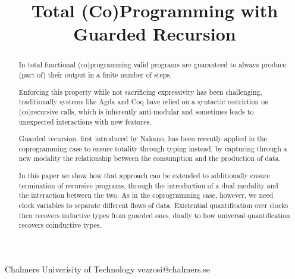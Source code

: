 \documentclass{sigplanconf}
\begin{document}
\setlength{\pdfpageheight}{\paperheight}
\setlength{\pdfpagewidth}{\paperwidth}






\title{Total (Co)Programming with Guarded Recursion}

           {Chalmers Univerisity of Technology}
           {vezzosi@chalmers.se}

\maketitle

\begin{abstract}
In total functional (co)programming valid programs are guaranteed to
always produce (part of) their output in a finite number of steps.

Enforcing this property while not sacrificing expressivity has been
challenging, traditionally systems like Agda and Coq have relied on a
syntactic restriction on (co)recursive calls, which is inherently
anti-modular and sometimes leads to unexpected interactions with new
features.

Guarded recursion, first introduced by Nakano, has been recently
applied in the coprogramming case to ensure totality through typing
instead, by capturing through a new modality the relationship between
the consumption and the production of data.

In this paper we show how that approach can be extended to
additionally ensure termination of recursive programs, through the
introduction of a dual modality and the interaction between the
two. As in the coprogramming case, however, we need clock variables to
separate different flows of data. Existential quantification over
clocks then recovers inductive types from guarded ones, dually to how
universal quantification recovers coinductive types.


\end{abstract}
\end{document}
